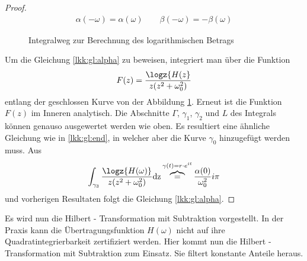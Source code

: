 \begin{satz}
\begin{proof}
\begin{align}
	\alpha(-\omega) = \alpha(\omega) \qquad \beta(-\omega) = -\beta(\omega)
\end{align}
\begin{figure}[ht]
	\centering
	\def\svgwidth{0.5\columnwidth}
	
	\caption{Integralweg zur Berechnung des logarithmischen Betrags}
	\label{fig:integralweg2}
\end{figure}
Um die Gleichung \ref{lkk:gl:alpha} zu beweisen, integriert man über die Funktion
\begin{align}
	F(z) = \frac{\logz{H(z}}{z(z^2+\omega_0^2)}
\end{align}
entlang der geschlossen Kurve von der Abbildung \ref{fig:integralweg2}. Erneut ist die Funktion $F(z)$ im Inneren analytisch. Die Abschnitte $\Gamma$, $\gamma_1$, $\gamma_2$ und $L$ des Integrals können genauso ausgewertet werden wie oben. Es resultiert eine ähnliche Gleichung wie in \ref{lkk:gl:end}, in welcher aber die Kurve $\gamma_0$ hinzugefügt werden muss. Aus 
\begin{align}
	\int_{\gamma_3} \frac{\logz{H(\omega)}}{z(z^2 + \omega_0^2)} \mathrm{dz} \overbrace{=}^{\gamma(t) = r \cdot e^{it} } \frac{\alpha(0)}{\omega_0^2} i\pi
\end{align} 
und vorherigen Resultaten folgt die Gleichung \ref{lkk:gl:alpha}.
\end{proof}
\end{satz}
Es wird nun die Hilbert - Transformation mit Subtraktion \cite{Triverio2006a} vorgestellt. In der Praxis kann die Übertragungsfunktion $H(\omega)$ nicht auf ihre Quadratintegrierbarkeit zertifiziert werden. Hier kommt nun die Hilbert - Transformation mit Subtraktion zum Einsatz. Sie filtert konstante Anteile heraus.
